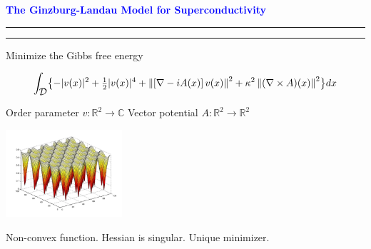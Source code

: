 \documentclass{seminar}
\newcommand{\R}{\mbox{${\mathbb R}$}}
\newcommand{\C}{\mbox{${\mathbb C}$}}
\newcommand{\grad}{\nabla}
\newcommand{\half}{{\textstyle{\frac{1}{2}}}}
\newcommand{\redstripe}{\textcolor{red}{\hrule height 2.0pt\hfil}
             \vspace{-1.8pt}
             \textcolor{red}{\hrule height 1.0pt\hfil}
}
\newcommand{\heading}[1]{%
   \centerline{\textcolor{blue}{\textbf{#1}}}%
    \redstripe%
    \bigskip
}
\newcommand{\cD} {\mbox{$\cal D$}}
\begin{document}
\begin{slide}

\heading{The Ginzburg-Landau Model for Superconductivity}

Minimize the Gibbs free energy
 
{\small
\[
\int _ {\cD} \bigl \{ - | v (x) |^2 + \half | v (x) |^4  + 
\left \| \left [ \nabla - i A(x) \right ] v (x) \right \| ^2  +  \\
\kappa^2 \left \| ( \grad \times A ) (x) \right \| ^2 \bigr \} dx
\]
}
%
\begin{minipage}[b]{.45\linewidth}
Order parameter $ v : \R^2 \to \C$ 
Vector potential $A : \R^2 \to \R^2 $    
 \vspace{4em}
\end{minipage} 
\hfil 
\begin{minipage}[b]{.45\linewidth}
\centerline{\includegraphics[width=1.7in]{../images/gl2}}
\end{minipage}

Non-convex function. Hessian is singular.
Unique minimizer. %

\vfill

\end{slide}
\end{document}
